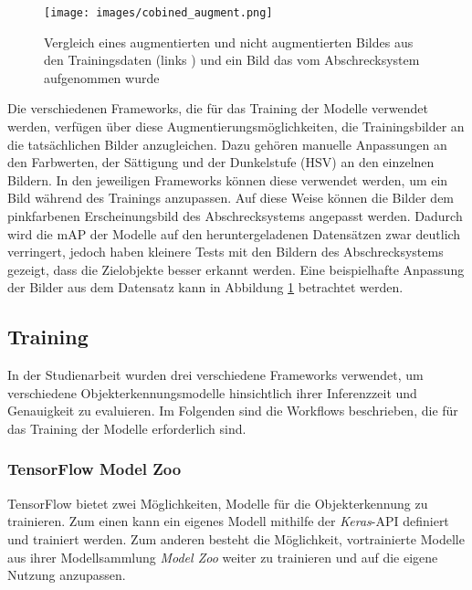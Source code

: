 \begin{figure}[H]
    \centering
    \texttt{[image: images/cobined\_augment.png]}
    \label{fig:vgl_img_data_real}
    \caption{Vergleich eines augmentierten und nicht augmentierten Bildes aus den Trainingsdaten (links \cite{wasch_detect}) und ein Bild das vom Abschrecksystem aufgenommen wurde}
\end{figure}

Die verschiedenen Frameworks, die für das Training der Modelle verwendet werden, verfügen über diese Augmentierungsmöglichkeiten, die Trainingsbilder an die tatsächlichen Bilder anzugleichen. Dazu gehören manuelle Anpassungen an den Farbwerten, der Sättigung und der Dunkelstufe (HSV) an den einzelnen Bildern. In den jeweiligen Frameworks können diese verwendet werden, um ein Bild während des Trainings anzupassen. Auf diese Weise können die Bilder dem pinkfarbenen Erscheinungsbild des Abschrecksystems angepasst werden. Dadurch wird die \ac{mAP} der Modelle auf den heruntergeladenen Datensätzen zwar deutlich verringert, jedoch haben kleinere Tests mit den Bildern des Abschrecksystems gezeigt, dass die Zielobjekte besser erkannt werden. Eine beispielhafte Anpassung der Bilder aus dem Datensatz kann in Abbildung \ref{fig:vgl_img_data_real} betrachtet werden.


\subsection{Training}

In der Studienarbeit wurden drei verschiedene Frameworks verwendet, um verschiedene Objekterkennungsmodelle hinsichtlich ihrer Inferenzzeit und Genauigkeit zu evaluieren. Im Folgenden sind die Workflows beschrieben, die für das Training der Modelle erforderlich sind.

\subsubsection{TensorFlow Model Zoo} \label{cap:tensorflow}

TensorFlow bietet zwei Möglichkeiten, Modelle für die Objekterkennung zu trainieren. Zum einen kann ein eigenes Modell mithilfe der \textit{Keras}-API definiert und trainiert werden. Zum anderen besteht die Möglichkeit, vortrainierte Modelle aus ihrer Modellsammlung \textit{Model Zoo} weiter zu trainieren und auf die eigene Nutzung anzupassen. 

